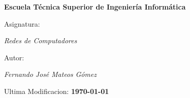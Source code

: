 \begin{titlepage}
        \centering
        {\bfseries\LARGE Escuela Técnica Superior de Ingeniería Informática \par}
        \vspace{1cm}
        {\Large Asignatura: \par \textit{Redes de Computadores} \par}
        \vspace{1cm}
        {\Large Autor: \par \textit{Fernando José Mateos Gómez} \par}
        \vspace{2cm}
        {\Large Ultima Modificacion: \textbf{\today} \par}
        \vspace{2cm}
\end{titlepage}
\restoregeometry